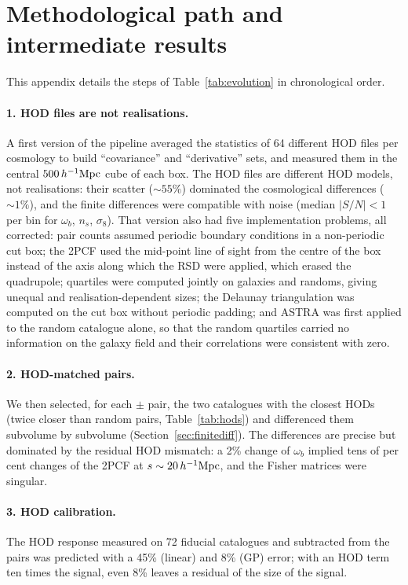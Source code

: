 \section{Methodological path and intermediate results}
\label{app:path}

This appendix details the steps of Table~\ref{tab:evolution} in chronological order.

\paragraph{1. HOD files are not realisations.} A first version of the pipeline averaged the statistics of 64 different HOD files per cosmology to build ``covariance'' and ``derivative'' sets, and measured them in the central $500\,h^{-1}\mathrm{Mpc}$ cube of each box. The HOD files are different HOD models, not realisations: their scatter ($\sim55\%$) dominated the cosmological differences ($\sim1\%$), and the finite differences were compatible with noise (median $|S/N|<1$ per bin for $\omega_b$, $n_s$, $\sigma_8$). That version also had five implementation problems, all corrected: pair counts assumed periodic boundary conditions in a non-periodic cut box; the 2PCF used the mid-point line of sight from the centre of the box instead of the axis along which the RSD were applied, which erased the quadrupole; quartiles were computed jointly on galaxies and randoms, giving unequal and realisation-dependent sizes; the Delaunay triangulation was computed on the cut box without periodic padding; and ASTRA was first applied to the random catalogue alone, so that the random quartiles carried no information on the galaxy field and their correlations were consistent with zero.

\paragraph{2. HOD-matched pairs.} We then selected, for each $\pm$ pair, the two catalogues with the closest HODs (twice closer than random pairs, Table~\ref{tab:hods}) and differenced them subvolume by subvolume (Section~\ref{sec:finitediff}). The differences are precise but dominated by the residual HOD mismatch: a 2\% change of $\omega_b$ implied tens of per cent changes of the 2PCF at $s\sim20\,h^{-1}\mathrm{Mpc}$, and the Fisher matrices were singular.

\paragraph{3. HOD calibration.} The HOD response measured on 72 fiducial catalogues and subtracted from the pairs was predicted with a 45\% (linear) and 8\% (GP) error; with an HOD term ten times the signal, even 8\% leaves a residual of the size of the signal.

